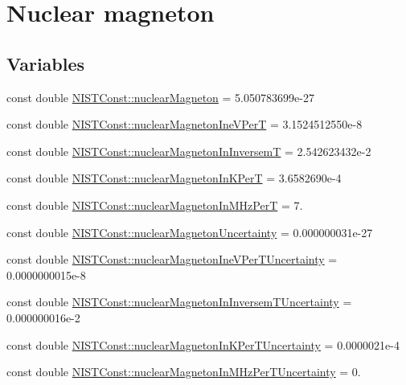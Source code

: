 \hypertarget{group___nuclear_magneton}{}\section{Nuclear magneton}
\label{group___nuclear_magneton}
\subsection*{Variables}
\begin{DoxyCompactItemize}
\item 
const double \hyperlink{group___nuclear_magneton_gacf9b0d2a2517113d30300e4ed7b56cc7}{N\+I\+S\+T\+Const\+::nuclear\+Magneton} = 5.\+050783699e-\/27
\item 
const double \hyperlink{group___nuclear_magneton_ga5a31a1865923a1c14cd7f22c8973186e}{N\+I\+S\+T\+Const\+::nuclear\+Magneton\+Ine\+V\+PerT} = 3.\+1524512550e-\/8
\item 
const double \hyperlink{group___nuclear_magneton_ga2bb8e56daaa602b5097d38b2d1ca32ad}{N\+I\+S\+T\+Const\+::nuclear\+Magneton\+In\+InversemT} = 2.\+542623432e-\/2
\item 
const double \hyperlink{group___nuclear_magneton_gac546d7a48ca06ce3231f7cda738bb4e3}{N\+I\+S\+T\+Const\+::nuclear\+Magneton\+In\+K\+PerT} = 3.\+6582690e-\/4
\item 
const double \hyperlink{group___nuclear_magneton_gae1ed12acbc3f50345ed451327b86b5b5}{N\+I\+S\+T\+Const\+::nuclear\+Magneton\+In\+M\+Hz\+PerT} = 7.
\item 
const double \hyperlink{group___nuclear_magneton_ga1f693f4e6c1d8f771594a847e185b072}{N\+I\+S\+T\+Const\+::nuclear\+Magneton\+Uncertainty} = 0.\+000000031e-\/27
\item 
const double \hyperlink{group___nuclear_magneton_gad4934d98a9f09cb4bae556e2aa11ff84}{N\+I\+S\+T\+Const\+::nuclear\+Magneton\+Ine\+V\+Per\+T\+Uncertainty} = 0.\+0000000015e-\/8
\item 
const double \hyperlink{group___nuclear_magneton_ga084f0bd27d89a4475362e8e2e0393bfa}{N\+I\+S\+T\+Const\+::nuclear\+Magneton\+In\+Inversem\+T\+Uncertainty} = 0.\+000000016e-\/2
\item 
const double \hyperlink{group___nuclear_magneton_gaf3f8996bdff7edd5515c4a91fe599509}{N\+I\+S\+T\+Const\+::nuclear\+Magneton\+In\+K\+Per\+T\+Uncertainty} = 0.\+0000021e-\/4
\item 
const double \hyperlink{group___nuclear_magneton_gafadaf7c2f76a76acf9313700c176b0a2}{N\+I\+S\+T\+Const\+::nuclear\+Magneton\+In\+M\+Hz\+Per\+T\+Uncertainty} = 0.
\end{DoxyCompactItemize}


